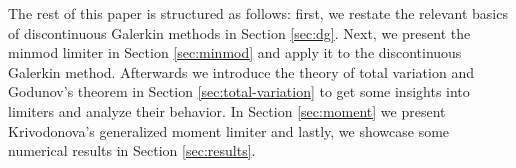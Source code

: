 The rest of this paper is structured as follows: first, we restate the relevant basics of discontinuous Galerkin methods in Section \ref{sec:dg}.
Next, we present the minmod limiter in Section \ref{sec:minmod} and apply it to the discontinuous Galerkin method.
Afterwards we introduce the theory of total variation and Godunov's theorem in Section \ref{sec:total-variation} to get some insights into limiters and analyze their behavior.
In Section \ref{sec:moment} we present Krivodonova's generalized moment limiter and lastly, we showcase some numerical results in Section \ref{sec:results}.
